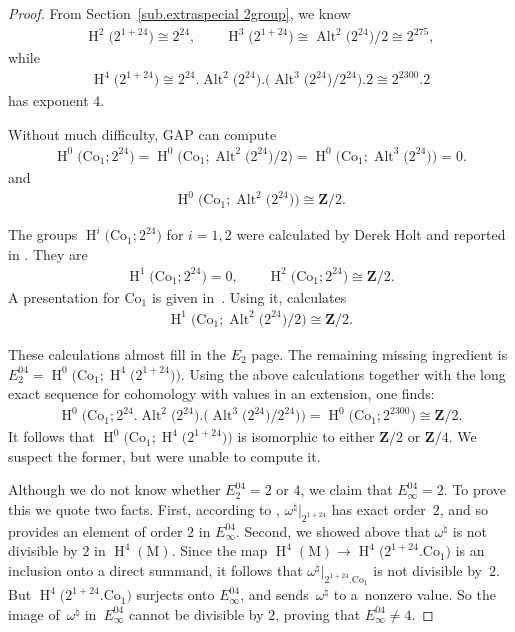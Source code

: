 \documentclass[pdftex]{sigma}
\numberwithin{equation}{section}
\newcommand\bZ{\mathbf Z}
\newcommand\rM{\mathrm M}
\DeclareMathOperator\homology{H}
\renewcommand\H{\homology}
\newcommand\<\langle
\renewcommand\>\rangle
\newcommand\Co{\mathrm{Co}}
\DeclareMathOperator\Alt{Alt}
\begin{document}
\begin{proof}
 From Section~\ref{sub.extraspecial 2group}, we know
 \begin{gather*} \H^2\big(2^{1+24}\big) \cong 2^{24}, \qquad \H^3\big(2^{1+24}\big) \cong \Alt^2\big(2^{24}\big)/2 \cong 2^{275},\end{gather*}
 while
 \begin{gather*} \H^4\big(2^{1+24}\big) \cong 2^{24}.\Alt^2\big(2^{24}\big).\big(\Alt^3\big(2^{24}\big)/2^{24}\big).2 \cong 2^{2300}.2 \end{gather*}
 has exponent $4$.

 Without much difficulty, GAP can compute
 \begin{gather*} \H^0\big(\Co_1; 2^{24}\big) = \H^0\big(\Co_1; \Alt^2\big(2^{24}\big)/2\big) = \H^0\big(\Co_1; \Alt^3\big(2^{24}\big)\big) = 0.\end{gather*}
 and
 \begin{gather*} \H^0\big(\Co_1; \Alt^2\big(2^{24}\big)\big) \cong \bZ/2. \end{gather*}

 The groups $\H^i\big(\Co_1; 2^{24}\big)$ for $i=1,2$ were calculated by Derek Holt and reported in \cite[Lemma~1.8.8]{Ivanov09}. They are
 \begin{gather*} \H^1\big(\Co_1; 2^{24}\big) = 0, \qquad \H^2\big(\Co_1; 2^{24}\big) \cong \bZ/2. \end{gather*}
 A presentation for $\Co_1$ is given in~\cite{MR886429}. Using it, \cite[Section~3.5]{JFmoonshine} calculates
 \begin{gather*} \H^1\big(\Co_1; \Alt^2\big(2^{24}\big)/2\big) \cong \bZ/2.\end{gather*}

 These calculations almost fill in the $E_2$ page. The remaining missing ingredient is $E_2^{04} = \H^0\big(\Co_1; \H^4\big(2^{1+24}\big)\big)$.
 Using the above calculations together with the long exact sequence for cohomology with values in an extension, one finds:
 \begin{gather*} \H^0\big(\Co_1; 2^{24}.\Alt^2\big(2^{24}\big).\big(\Alt^3\big(2^{24}\big)/2^{24}\big)\big) = \H^0\big(\Co_1; 2^{2300}\big) \cong \bZ/2. \end{gather*}
 It follows that $\H^0\big(\Co_1; \H^4\big(2^{1+24}\big)\big)$ is isomorphic to either $\bZ/2$ or $\bZ/4$. We suspect the former, but were unable to compute it.

 Although we do not know whether $E_2^{04} = 2$ or $4$, we claim that $E_\infty^{04} = 2$. To prove this we quote two facts. First, according to \cite[Section~3.5]{JFmoonshine}, $\omega^\natural|_{2^{1+24}}$ has exact order~$2$, and so provides an element of order $2$ in $E_\infty^{04}$. Second, we showed above that $\omega^\natural$ is not divisible by $2$ in $\H^4(\rM)$. Since the map $\H^4(\rM) \to \H^4\big(2^{1+24}.\Co_1\big)$ is an inclusion onto a direct summand, it follows that $\omega^\natural|_{2^{1+24}.\Co_1}$ is not divisible by~$2$. But $\H^4\big(2^{1+24}.\Co_1\big)$ surjects onto $E_\infty^{04}$, and sends~$\omega^\natural$ to a~nonzero value. So the image of~$\omega^\natural$ in~$E_\infty^{04}$ cannot be divisible by $2$, proving that $E_\infty^{04} \neq 4$.


\end{proof}
\end{document}
